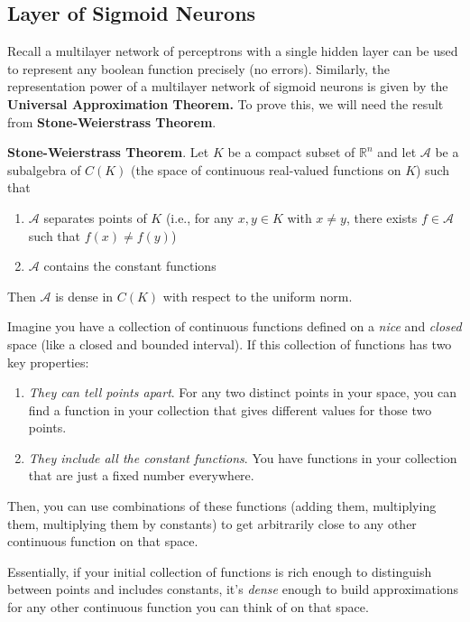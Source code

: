 \subsection{Layer of Sigmoid Neurons}

Recall a multilayer network of perceptrons with a single hidden layer can be used to represent any boolean function precisely (no errors). Similarly, the representation power of a multilayer network of sigmoid neurons is given by the \textbf{Universal Approximation Theorem.} To prove this, we will need the result from \textbf{Stone-Weierstrass Theorem}. 

\begin{theorem}
    \label{thm:stone-weierstrass}
    \textbf{Stone-Weierstrass Theorem}. Let $K$ be a compact subset of $\mathbb{R}^n$ and let $\mathcal{A}$ be a subalgebra of $C(K)$ (the space of continuous real-valued functions on $K$) such that 
\begin{enumerate}
    \item $\mathcal{A}$ separates points of $K$ (i.e., for any $x, y \in K$ with $x \neq y$, there exists $f \in \mathcal{A}$ such that $f(x) \neq f(y)$)
    \item $\mathcal{A}$ contains the constant functions
\end{enumerate}
Then $\mathcal{A}$ is dense in $C(K)$ with respect to the uniform norm.
\end{theorem}

Imagine you have a collection of continuous functions defined on a \textit{nice} and \textit{closed} space (like a closed and bounded interval). If this collection of functions has two key properties:
\begin{enumerate}
    \item \textit{They can tell points apart}. For any two distinct points in your space, you can find a function in your collection that gives different values for those two points.
    \item \textit{They include all the constant functions}. You have functions in your collection that are just a fixed number everywhere.
\end{enumerate}
Then, you can use combinations of these functions (adding them, multiplying them, multiplying them by constants) to get arbitrarily close to any other continuous function on that space.

Essentially, if your initial collection of functions is rich enough to distinguish between points and includes constants, it's \textit{dense} enough to build approximations for any other continuous function you can think of on that space.

